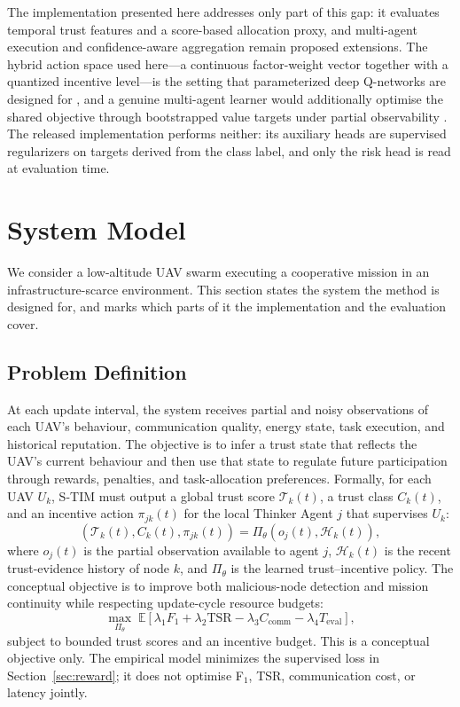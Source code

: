 \documentclass[notspecified,article,submit,moreauthors]{Definitions/mdpi}
\begin{document}
The implementation presented here addresses only part of this gap: it evaluates temporal trust features and a score-based allocation proxy, and multi-agent execution and confidence-aware aggregation remain proposed extensions. The hybrid action space used here---a continuous factor-weight vector together with a quantized incentive level---is the setting that parameterized deep Q-networks are designed for \cite{xiong2018pdqn,hausknecht2016parameterized}, and a genuine multi-agent learner would additionally optimise the shared objective through bootstrapped value targets under partial observability \cite{bertsekas1996reinforcement,hausknecht2015drqn}. The released implementation performs neither: its auxiliary heads are supervised regularizers on targets derived from the class label, and only the risk head is read at evaluation time.

\section{System Model}
\label{sec:system_model}

We consider a low-altitude UAV swarm executing a cooperative mission in an infrastructure-scarce environment. This section states the system the method is designed for, and marks which parts of it the implementation and the evaluation cover.

\subsection{Problem Definition}
\label{sec:problem_definition}
At each update interval, the system receives partial and noisy observations of each UAV's behaviour, communication quality, energy state, task execution, and historical reputation. The objective is to infer a trust state that reflects the UAV's current behaviour and then use that state to regulate future participation through rewards, penalties, and task-allocation preferences. Formally, for each UAV $U_k$, S-TIM must output a global trust score $\mathcal{T}_k(t)$, a trust class $C_k(t)$, and an incentive action $\pi_{jk}(t)$ for the local Thinker Agent $j$ that supervises $U_k$:
\begin{equation}
\left(\mathcal{T}_k(t), C_k(t), \pi_{jk}(t)\right)
= \Pi_{\theta}\!\left(o_j(t), \mathcal{H}_k(t)\right),
\end{equation}
where $o_j(t)$ is the partial observation available to agent $j$, $\mathcal{H}_k(t)$ is the recent trust-evidence history of node $k$, and $\Pi_{\theta}$ is the learned trust--incentive policy. The conceptual objective is to improve both malicious-node detection and mission continuity while respecting update-cycle resource budgets:
\begin{equation}
\max_{\Pi_{\theta}}\; \mathbb{E}\!\left[\lambda_1 F_1 + \lambda_2 \mathrm{TSR}
- \lambda_3 C_{\mathrm{comm}} - \lambda_4 T_{\mathrm{eval}}\right],
\end{equation}
subject to bounded trust scores and an incentive budget. This is a conceptual objective only. The empirical model minimizes the supervised loss in Section~\ref{sec:reward}; it does not optimise F$_1$, TSR, communication cost, or latency jointly.
\end{document}
